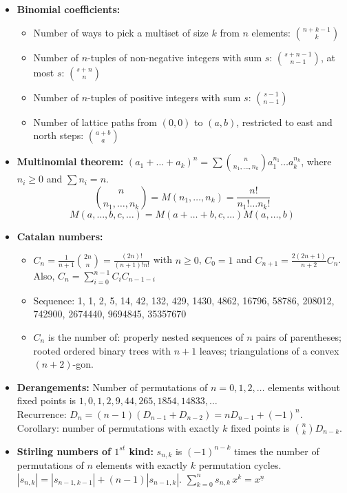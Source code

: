 \begin{small}
\begin{itemize}
    \item \textbf{Binomial coefficients:}
    \begin{itemize}
        \item Number of ways to pick a multiset of size $k$ from $n$ elements: ${n+k-1 \choose k}$
        \item Number of $n$-tuples of non-negative integers with sum $s$: ${s+n-1 \choose n-1}$, at most $s$: ${s + n \choose n}$
        \item Number of $n$-tuples of positive integers with sum $s$: ${s-1 \choose n-1}$
        \item Number of lattice paths from $(0,0)$ to $(a,b)$, restricted to east and north steps: ${a+b \choose a}$
    \end{itemize}

    \item \textbf{Multinomial theorem:}
    $(a_1+\dots+a_k)^n = \sum {n \choose n_1,\dots,n_k} a_1^{n_1} \dots a_k^{n_k}$, where $n_i \ge 0$ and $\sum n_i=n$.
    \[ {n \choose n_1,\dots,n_k} = M(n_1,\dots,n_k) = \frac{n!}{n_1! \dots n_k!} \]
    \[ M(a,\dots,b,c,\dots) = M(a+\dots+b,c,\dots) M(a,\dots,b) \]

    \item \textbf{Catalan numbers:}
    \begin{itemize}
        \item $C_n = \frac{1}{n+1} \binom{2n}{n} = \frac{(2n)!}{(n+1)!n!}$ with $n \geq 0$, $C_0 = 1$ and $C_{n+1} = \frac{2(2n + 1)}{n + 2} C_{n}$. Also, $C_n=\sum_{i=0}^{n-1} C_i C_{n-1-i}$    
        \item Sequence: 1, 1, 2, 5, 14, 42, 132, 429, 1430, 4862, 16796, 58786, 208012, 742900, 2674440, 9694845, 35357670
        \item $C_n$ is the number of: properly nested sequences of $n$ pairs of parentheses; rooted ordered binary trees with $n+1$ leaves; triangulations of a convex $(n+2)$-gon.
    \end{itemize}

    \item \textbf{Derangements:}
    Number of permutations of $n=0,1,2,\dots$ elements without fixed points is $1, 0, 1, 2, 9, 44, 265, 1854, 14833, \dots$ \\
    Recurrence: $D_n = (n-1)(D_{n-1} + D_{n-2}) = n D_{n-1} + (-1)^n$. \\
    Corollary: number of permutations with exactly $k$ fixed points is ${n \choose k} D_{n-k}$.

    \item \textbf{Stirling numbers of $1^{st}$ kind:}
    $s_{n,k}$ is $(-1)^{n-k}$ times the number of permutations of $n$ elements with exactly $k$ permutation cycles. \\
    $|s_{n,k}| = |s_{n-1,k-1}| + (n-1) |s_{n-1,k}|$. \quad
    $\sum_{k=0}^n s_{n,k}\,x^k = x^{\underline n}$


\end{itemize}
\end{small}
